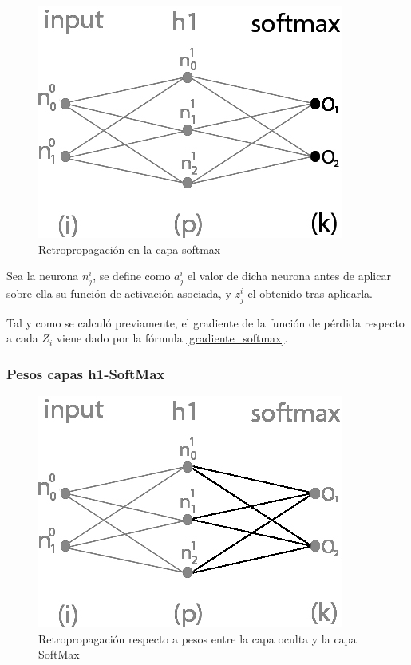 \begin{figure}[H]
	\centering
	\includegraphics[scale=0.35]{imagenes/nn_1_capa_output.jpg}  
	\caption{Retropropagación en la capa softmax}
	\label{fig:nn_1_capa_output}
\end{figure}

Sea la neurona $n^i_j$, se define como $a^i_j$ el valor de dicha neurona antes de aplicar sobre ella su función de activación asociada, y $z^i_j$ el obtenido tras aplicarla. 

Tal y como se calculó previamente, el gradiente de la función de pérdida respecto a cada $Z_i$ viene dado por la fórmula \ref{gradiente_softmax}.


\subsubsection{Pesos capas h1-SoftMax}

\begin{figure}[H]
	\centering
	\includegraphics[scale=0.35]{imagenes/nn_1_capa_pesos_h1_output.jpg}  
	\caption{Retropropagación respecto a pesos entre la capa oculta y la capa SoftMax}
	\label{fig:nn_1_pesos_h1_output}
\end{figure}


